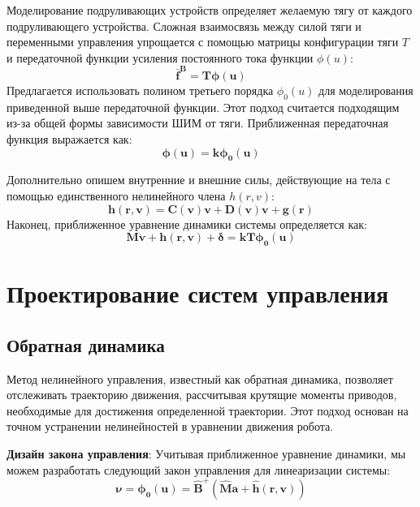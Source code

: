     Моделирование подруливающих устройств определяет желаемую тягу от каждого подруливающего устройства. Сложная взаимосвязь между силой тяги и переменными управления упрощается с помощью матрицы конфигурации тяги $T$ и передаточной функции усиления постоянного тока функции $\phi(u)$:
    \begin{equation*}
        \mathbf{\bar{f}^B=T\boldsymbol{\phi}(u)}
    \end{equation*}
    Предлагается использовать полином третьего порядка $\phi_0(u)$ для моделирования приведенной выше передаточной функции. Этот подход считается подходящим из-за общей формы зависимости ШИМ от тяги. 
    Приближенная передаточная функция выражается как: 
    \begin{equation*}
        \mathbf{\boldsymbol{\phi}(u) = k\boldsymbol{\phi}_0(u)}
    \end{equation*}
    
    Дополнительно опишем внутренние и внешние силы, действующие на 
    тела с помощью единственного нелинейного члена $h(r,v)$:
    \begin{equation*}
        \mathbf{h(r,v) = C(v)v + D(v)v + g(r)}
    \end{equation*}
    Наконец, приближенное уравнение динамики системы определяется как:
    \begin{equation*}
        \mathbf{M \dot{v} + h(r, v) + \boldsymbol{\delta} = kT\boldsymbol{\phi}_0(u)}
    \end{equation*}

\section{Проектирование систем управления}

\subsection{Обратная динамика}

    Метод нелинейного управления, известный как обратная динамика, позволяет отслеживать траекторию движения, рассчитывая крутящие моменты приводов, необходимые для достижения определенной траектории. Этот подход основан на точном устранении нелинейностей в уравнении движения робота.

    \textbf{Дизайн закона управления}: Учитывая приближенное уравнение динамики, мы можем разработать следующий закон управления для линеаризации системы:
    \begin{equation*}
        \mathbf{\boldsymbol{\nu} = \boldsymbol{\phi}_0(u) = \hat{B}^{+}(\hat{M}a + \hat{h}(r, v))}
    \end{equation*}
    
